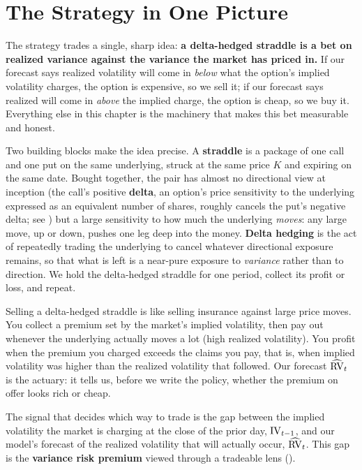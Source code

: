 \section{The Strategy in One Picture}
\label{sec:ivrv:picture}

The strategy trades a single, sharp idea: \textbf{a delta-hedged straddle is a bet on realized variance against the variance the market has priced in.} If our forecast says realized volatility will come in \emph{below} what the option's implied volatility charges, the option is expensive, so we sell it; if our forecast says realized will come in \emph{above} the implied charge, the option is cheap, so we buy it. Everything else in this chapter is the machinery that makes this bet measurable and honest.

Two building blocks make the idea precise. A \textbf{straddle} is a package of one call and one put on the same underlying, struck at the same price $K$ and expiring on the same date. Bought together, the pair has almost no directional view at inception (the call's positive \textbf{delta}, an option's price sensitivity to the underlying expressed as an equivalent number of shares, roughly cancels the put's negative delta; see ) but a large sensitivity to how much the underlying \emph{moves}: any large move, up or down, pushes one leg deep into the money. \textbf{Delta hedging} is the act of repeatedly trading the underlying to cancel whatever directional exposure remains, so that what is left is a near-pure exposure to \emph{variance} rather than to direction. We hold the delta-hedged straddle for one period, collect its profit or loss, and repeat.

\begin{intuition}
Selling a delta-hedged straddle is like selling insurance against large price moves. You collect a premium set by the market's implied volatility, then pay out whenever the underlying actually moves a lot (high realized volatility). You profit when the premium you charged exceeds the claims you pay, that is, when implied volatility was higher than the realized volatility that followed. Our forecast $\widehat{\operatorname{RV}}_t$ is the actuary: it tells us, before we write the policy, whether the premium on offer looks rich or cheap.
\end{intuition}

The signal that decides which way to trade is the gap between the implied volatility the market is charging at the close of the prior day, $\operatorname{IV}_{t-1}$, and our model's forecast of the realized volatility that will actually occur, $\widehat{\operatorname{RV}}_t$. This gap is the \textbf{variance risk premium} viewed through a tradeable lens ().

